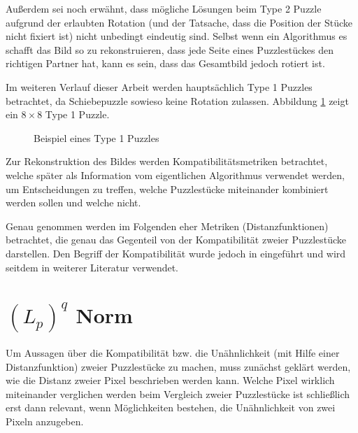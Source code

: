 \documentclass{whswinvcbook}
\begin{document}
Außerdem sei noch erwähnt, dass mögliche Lösungen beim Type 2 Puzzle aufgrund der erlaubten Rotation (und der Tatsache, dass die Position der Stücke nicht fixiert ist) nicht unbedingt eindeutig sind. Selbst wenn ein Algorithmus es schafft das Bild so zu rekonstruieren, dass jede Seite eines Puzzlestückes den richtigen Partner hat, kann es sein, dass das Gesamtbild jedoch rotiert ist.

Im weiteren Verlauf dieser Arbeit werden hauptsächlich Type 1 Puzzles betrachtet, da Schiebepuzzle sowieso keine Rotation zulassen. Abbildung \ref{fig-jigswap} zeigt ein $8\times 8$ Type 1 Puzzle.
\begin{figure}[H]
    \centering
    \quad\quad\quad\quad
    \caption{Beispiel eines Type 1 Puzzles}
    \label{fig-jigswap}
\end{figure}
Zur Rekonstruktion des Bildes werden Kompatibilitätsmetriken betrachtet, welche später als Information vom eigentlichen Algorithmus verwendet werden, um Entscheidungen zu treffen, welche Puzzlestücke miteinander kombiniert werden sollen und welche nicht.

Genau genommen werden im Folgenden eher Metriken (Distanzfunktionen) betrachtet, die genau das Gegenteil von der Kompatibilität zweier Puzzlestücke darstellen. Den Begriff der Kompatibilität wurde jedoch in \cite{pomeranz} eingeführt und wird seitdem in weiterer Literatur verwendet.
\section{$(L_p)^q$ Norm}
Um Aussagen über die Kompatibilität bzw. die Unähnlichkeit (mit Hilfe einer Distanzfunktion) zweier Puzzlestücke zu machen, muss zunächst geklärt werden, wie die Distanz zweier Pixel beschrieben werden kann. Welche Pixel wirklich miteinander verglichen werden beim Vergleich zweier Puzzlestücke ist schließlich erst dann relevant, wenn Möglichkeiten bestehen, die Unähnlichkeit von zwei Pixeln anzugeben.
\end{document}
